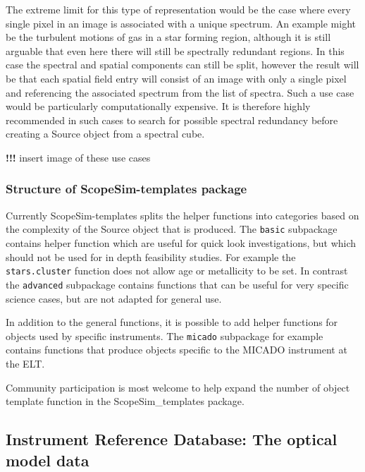 The extreme limit for this type of representation would be the case where every single pixel in an image is associated with a unique spectrum.
An example might be the turbulent motions of gas in a star forming region, although it is still arguable that even here there will still be spectrally redundant regions.
In this case the spectral and spatial components can still be split, however the result will be that each spatial field entry will consist of an image with only a single pixel and referencing the associated spectrum from the list of spectra.
Such a use case would be particularly computationally expensive.
It is therefore highly recommended in such cases to search for possible spectral redundancy before creating a \textquotedbl{}Source\textquotedbl{} object from a spectral cube.

\textbf{!!!} insert image of these use cases


\subsubsection{Structure of ScopeSim-templates package%
  \label{structure-of-scopesim-templates-package}%
}

Currently ScopeSim-templates splits the helper functions into categories based on the complexity of the Source object that is produced.
The \texttt{basic} subpackage contains helper function which are useful for quick look investigations, but which should not be used for in depth feasibility studies.
For example the \texttt{stars.cluster} function does not allow age or metallicity to be set.
In contrast the \texttt{advanced} subpackage contains functions that can be useful for very specific science cases, but are not adapted for general use.

In addition to the general functions, it is possible to add helper functions for objects used by specific instruments.
The \texttt{micado} subpackage for example contains functions that produce objects specific to the MICADO instrument at the ELT.

Community participation is most welcome to help expand the number of object template function in the ScopeSim\_templates package.


\subsection{Instrument Reference Database: The optical model data%
  \label{instrument-reference-database-the-optical-model-data}%
}

